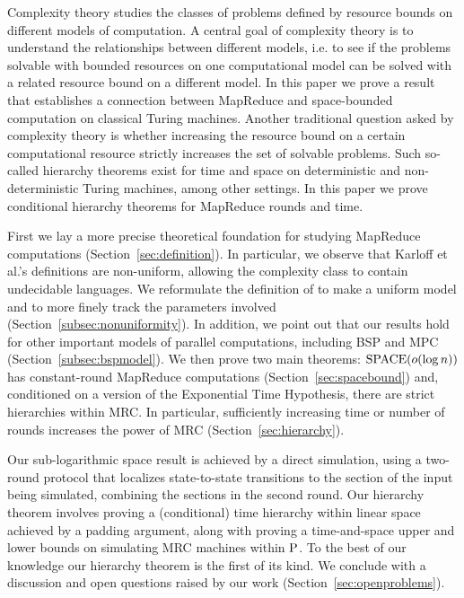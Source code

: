 \documentclass[11pt]{article}
\theoremstyle{definition}
\theoremstyle{remark}
\newcommand{\SPACE}{\textup{SPACE}}
\newcommand{\TISP}{\textup{TISP}}
\renewcommand{\P}{\textup{P}}
\begin{document}
Complexity theory studies the classes of problems defined by resource bounds on
different models of computation. A central goal of complexity theory is to
understand the relationships between different models, i.e. to see if the
problems solvable with bounded resources on one computational model can be
solved with a related resource bound on a different model.  In this paper we
prove a result that establishes a connection between MapReduce and
space-bounded computation on classical Turing machines.  Another traditional
question asked by complexity theory is whether increasing the resource bound on
a certain computational resource strictly increases the set of solvable
problems. Such so-called hierarchy theorems exist for time and space on
deterministic and non-deterministic Turing machines, among other settings.  In
this paper we prove conditional hierarchy theorems for MapReduce rounds and
time.

First we lay a more precise theoretical foundation for studying MapReduce
computations (Section~\ref{sec:definition}).
In particular, we observe that Karloff et al.'s definitions are
non-uniform, allowing the complexity class to contain undecidable languages.
We reformulate the definition of
\cite{Karloff10} to make a uniform model and to more finely track the
parameters involved (Section~\ref{subsec:nonuniformity}).
In addition, we point out that our results hold for
other important models of parallel computations, including BSP and MPC (Section~\ref{subsec:bspmodel}).
We then prove two main
theorems: $\SPACE(o(\log n))$ has constant-round MapReduce computations
(Section~\ref{sec:spacebound}) and, conditioned on a version of the
Exponential Time Hypothesis, there are strict hierarchies within MRC.  In
particular, sufficiently increasing time or number of rounds increases the
power of MRC (Section~\ref{sec:hierarchy}).

Our sub-logarithmic space result is achieved by a direct simulation, using a
two-round protocol that localizes state-to-state transitions to the section of
the input being simulated, combining the sections in the second round.  Our hierarchy
theorem involves proving a (conditional) time hierarchy within linear space%
 achieved by a padding argument, along with proving a time-and-space upper and lower bounds on
simulating MRC machines within $\P$. To the best of our knowledge our
hierarchy theorem is the first of its kind. We conclude with a discussion and open questions
raised by our work (Section~\ref{sec:openproblems}).
\end{document}
